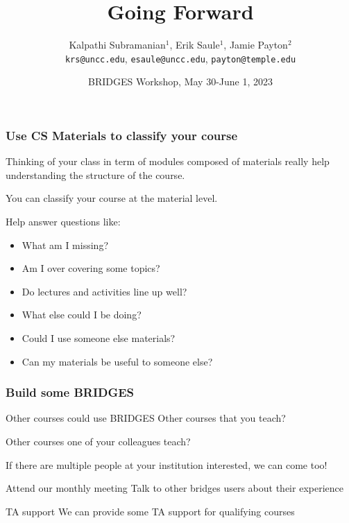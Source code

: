 \documentclass[aspectratio=169]{beamer}
\title{Going Forward}
\subtitle{}
\author{Kalpathi Subramanian$^1$, Erik Saule$^1$, Jamie Payton$^2$\\\texttt{krs@uncc.edu}, \texttt{esaule@uncc.edu}, \texttt{payton@temple.edu} }
\institute{$^1$The University of North Carolina at Charlotte\\$^2$Temple University}
\date{BRIDGES Workshop, May 30-June 1, 2023}
\begin{document}
\begin{frame}
\titlepage
\end{frame}



\begin{frame}
  \frametitle{Use CS Materials to classify your course}

  Thinking of your class in term of modules composed of materials really help understanding the structure of the course.

  You can classify your course at the material level.

  Help answer questions like:
  \begin{itemize}
  \item What am I missing?
  \item Am I over covering some topics?
  \item Do lectures and activities line up well?
  \item What else could I be doing?
  \item Could I use someone else materials?
  \item Can my materials be useful to someone else?
  \end{itemize}
\end{frame}

\begin{frame}
  \frametitle{Build some BRIDGES}
  \begin{block}{Other courses could use BRIDGES}
    Other courses that you teach?

    Other courses one of your colleagues teach?

    If there are multiple people at your institution interested, we can come too!
  \end{block}

  \begin{block}{Attend our monthly meeting}
    Talk to other bridges users about their experience
  \end{block}

  \begin{block}{TA support}
    We can provide some TA support for qualifying courses
  \end{block}
\end{frame}
\end{document}
